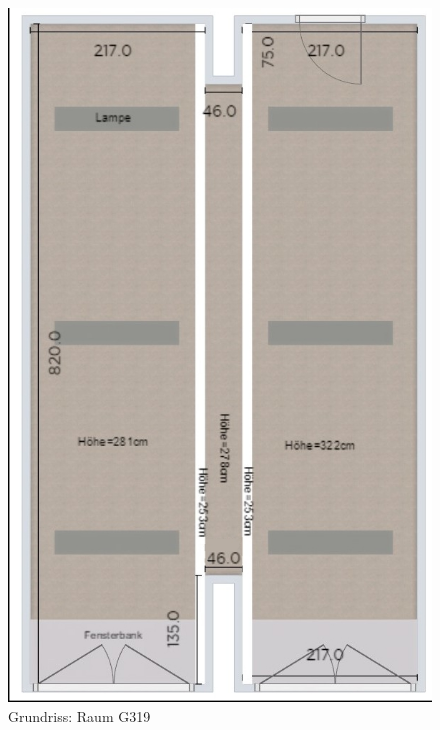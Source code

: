 \begin{figure}[H]
        \centering
        \begin{minipage}[b]{0.4\textwidth}
            \centering
            \includegraphics[width=\textwidth]{Abbildungen/Grundriss.jpg}
            \caption{Grundriss: Raum G319}
            \label{fig:grundriss}    
        \end{minipage}
        \hfill
        \begin{minipage}[b]{0.49\textwidth}
            \centering

\end{minipage}
\end{figure}
